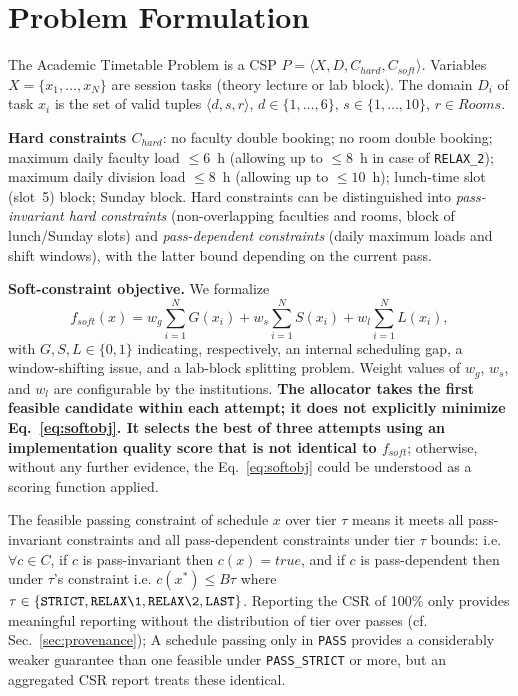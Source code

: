 \documentclass[conference]{IEEEtran}
\begin{document}
\section{Problem Formulation}
\label{sec:formulation}
The Academic Timetable Problem is a CSP $P=\langle X,D,C_{hard},C_{soft}\rangle$. Variables $X=\{x_1,\dots,x_N\}$ are session tasks (theory lecture or lab block). The domain $D_i$ of task $x_i$ is the set of valid tuples $\langle d,s,r\rangle$, $d\in\{1,\dots,6\}$, $s\in\{1,\dots,10\}$, $r\in Rooms$.

\textbf{Hard constraints $C_{hard}$}: no faculty double booking; no room double booking; maximum daily faculty load $\leq6$~h (allowing up to $\leq8$~h in case of \texttt{RELAX\_2}); maximum daily division load $\leq8$~h (allowing up to $\leq10$~h); lunch-time slot (slot~5) block; Sunday block. Hard constraints can be distinguished into \emph{pass-invariant hard constraints} (non-overlapping faculties and rooms, block of lunch/Sunday slots) and \emph{pass-dependent constraints} (daily maximum loads and shift windows), with the latter bound depending on the current pass.

\textbf{Soft-constraint objective.} We formalize
\begin{equation}
\label{eq:softobj}
f_{soft}(x)=w_g\!\sum_{i=1}^{N}\!G(x_i)+w_s\!\sum_{i=1}^{N}\!S(x_i)+w_l\!\sum_{i=1}^{N}\!L(x_i),
\end{equation}
with $G,S,L\in\{0,1\}$ indicating, respectively, an internal scheduling gap, a window-shifting issue, and a lab-block splitting problem. Weight values of $w_g$, $w_s$, and $w_l$ are configurable by the institutions. \textbf{The allocator takes the first feasible candidate within each attempt; it does not explicitly minimize Eq.~\eqref{eq:softobj}. It selects the best of three attempts using an implementation quality score that is not identical to $f_{soft}$}; otherwise, without any further evidence, the Eq.~\eqref{eq:softobj} could be understood as a scoring function applied. 

The feasible passing constraint of schedule $x$ over tier $\tau$ means it meets all pass-invariant constraints and all pass-dependent constraints under tier $\tau$ bounds: i.e. $\forall c \in C$, if $c$ is pass-invariant then $c(x) = true$, and if $c$ is pass-dependent then under $\tau$'s constraint i.e. $c(x^*) \leq B\tau$ where $\tau \in \{\texttt{STRICT}, \texttt{RELAX\1}, \texttt{RELAX\2}, \texttt{LAST}\}$. Reporting the CSR of 100\% only provides meaningful reporting without the distribution of tier over passes (cf. Sec.~\ref{sec:provenance}); A schedule passing only in \texttt{PASS\LAST} provides a considerably weaker guarantee than one feasible under \texttt{PASS\_STRICT} or more, but an aggregated CSR report treats these identical.
\end{document}
